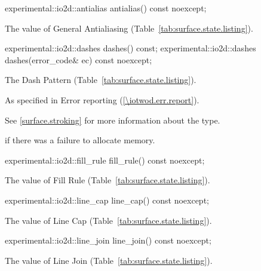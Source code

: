 \begin{itemdecl}
experimental::io2d::antialias antialias() const noexcept;
\end{itemdecl}
\begin{itemdescr}
\pnum
\returns
The value of General Antialiasing (Table~\ref{tab:surface.state.listing}).
\end{itemdescr}

\begin{itemdecl}
experimental::io2d::dashes dashes() const;
experimental::io2d::dashes dashes(error_code& ec) const noexcept;
\end{itemdecl}
\begin{itemdescr}
\pnum
\returns
The Dash Pattern (Table~\ref{tab:surface.state.listing}).

\pnum
\throws
As specified in Error reporting (\ref{\iotwod.err.report}).

\pnum
\remarks
See \ref{surface.stroking} for more information about the  type.

\pnum
\errors
{} if there was a failure to allocate memory.
\end{itemdescr}

\begin{itemdecl}
experimental::io2d::fill_rule fill_rule() const noexcept;
\end{itemdecl}
\begin{itemdescr}
\pnum
\returns
The value of Fill Rule (Table~\ref{tab:surface.state.listing}).
\end{itemdescr}

\begin{itemdecl}
experimental::io2d::line_cap line_cap() const noexcept;
\end{itemdecl}
\begin{itemdescr}
\pnum
\returns
The value of Line Cap (Table~\ref{tab:surface.state.listing}).
\end{itemdescr}

\begin{itemdecl}
experimental::io2d::line_join line_join() const noexcept;
\end{itemdecl}
\begin{itemdescr}
\pnum
\returns
The value of Line Join (Table~\ref{tab:surface.state.listing}).
\end{itemdescr}

